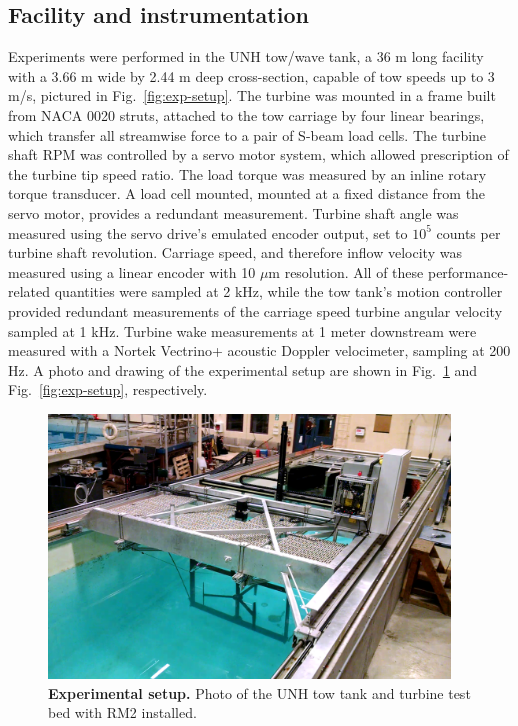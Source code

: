 \documentclass[10pt,letterpaper]{article}
\begin{document}
\subsection*{Facility and instrumentation}

Experiments were performed in the UNH tow/wave tank, a 36 m long facility with a
3.66 m wide by 2.44 m deep cross-section, capable of tow speeds up to 3 m/s,
pictured in Fig.~\ref{fig:exp-setup}. The turbine was mounted in a frame built
from NACA 0020 struts, attached to the tow carriage by four linear bearings,
which transfer all streamwise force to a pair of S-beam load cells. The turbine
shaft RPM was controlled by a servo motor system, which allowed prescription of
the turbine tip speed ratio. The load torque was measured by an inline rotary
torque transducer. A load cell mounted, mounted at a fixed distance from the
servo motor, provides a redundant measurement. Turbine shaft angle was measured
using the servo drive's emulated encoder output, set to $10^5$ counts per
turbine shaft revolution. Carriage speed, and therefore inflow velocity was
measured using a linear encoder with 10 $\mu$m resolution. All of these
performance-related quantities were sampled at 2 kHz, while the tow tank's
motion controller provided redundant measurements of the carriage speed turbine
angular velocity sampled at 1 kHz. Turbine wake measurements at 1 meter
downstream were measured with a Nortek Vectrino+ acoustic Doppler velocimeter,
sampling at 200 Hz. A photo and drawing of the experimental setup are shown in
Fig.~\ref{fig:exp-setup-photo} and Fig.~\ref{fig:exp-setup}, respectively.


\begin{figure}[h]
    \centering

    \includegraphics[width=0.95\textwidth]{figures/exp-setup-photo}

    \caption{\textbf{Experimental setup.} Photo of the UNH tow tank and turbine
    test bed with RM2 installed.}

    \label{fig:exp-setup-photo}
\end{figure}
\end{document}
